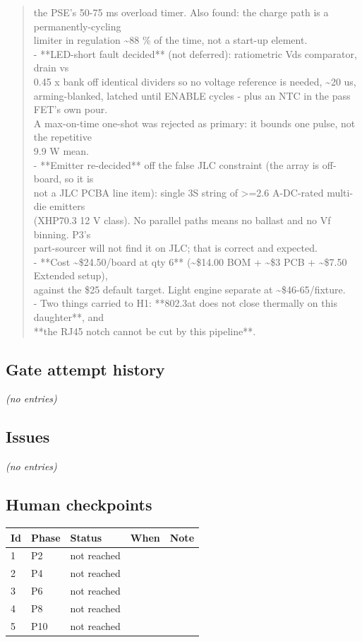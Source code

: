 \documentclass[11pt,a4paper]{article}
\begin{document}
\begin{quote}
  the PSE's 50-75 ms overload timer. Also found: the charge path is a permanently-cycling\\
  limiter in regulation \textasciitilde{}88 \% of the time, not a start-up element.\\
- {*}{*}LED-short fault decided{*}{*} (not deferred): ratiometric Vds comparator, drain vs\\
  0.45 x bank off identical dividers so no voltage reference is needed, \textasciitilde{}20 us,\\
  arming-blanked, latched until ENABLE cycles - plus an NTC in the pass FET's own pour.\\
  A max-on-time one-shot was rejected as primary: it bounds one pulse, not the repetitive\\
  9.9 W mean.\\
- {*}{*}Emitter re-decided{*}{*} off the false JLC constraint (the array is off-board, so it is\\
  not a JLC PCBA line item): single 3S string of \textgreater{}=2.6 A-DC-rated multi-die emitters\\
  (XHP70.3 12 V class). No parallel paths means no ballast and no Vf binning. P3's\\
  part-sourcer will not find it on JLC; that is correct and expected.\\
- {*}{*}Cost \textasciitilde{}\$24.50/board at qty 6{*}{*} (\textasciitilde{}\$14.00 BOM + \textasciitilde{}\$3 PCB + \textasciitilde{}\$7.50 Extended setup),\\
  against the \$25 default target. Light engine separate at \textasciitilde{}\$46-65/fixture.\\
- Two things carried to H1: {*}{*}802.3at does not close thermally on this daughter{*}{*}, and\\
  {*}{*}the RJ45 notch cannot be cut by this pipeline{*}{*}.
\end{quote}
\subsection*{Gate attempt history}
\emph{(no entries)}
\subsection*{Issues}
\emph{(no entries)}
\subsection*{Human checkpoints}
{\small
\begin{longtable}{lllp{2.6cm}p{6.4cm}}
\toprule
\textbf{Id} & \textbf{Phase} & \textbf{Status} & \textbf{When} & \textbf{Note} \\
\midrule
\endhead
1 & P2 & not reached &  &  \\
2 & P4 & not reached &  &  \\
3 & P6 & not reached &  &  \\
4 & P8 & not reached &  &  \\
5 & P10 & not reached &  &  \\
\bottomrule
\end{longtable}
}
\end{document}

